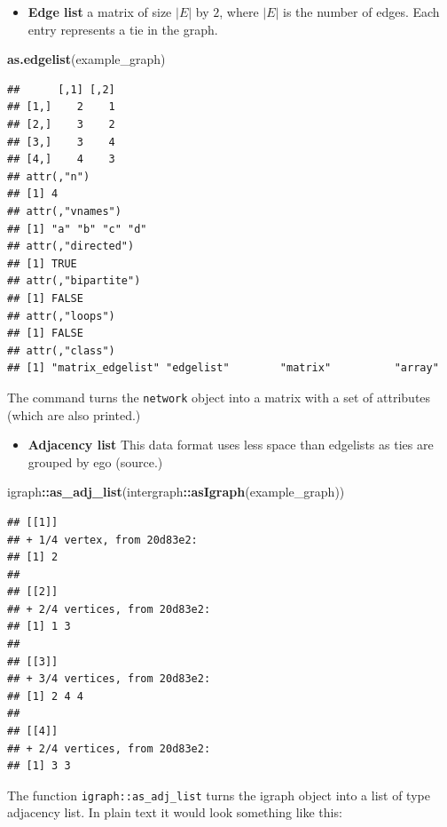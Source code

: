 \documentclass[
]{book}
\newenvironment{Shaded}{\begin{snugshade}}{\end{snugshade}}
\newcommand{\FunctionTok}[1]{\textcolor[rgb]{0.13,0.29,0.53}{\textbf{#1}}}
\newcommand{\NormalTok}[1]{#1}
\newcommand{\SpecialCharTok}[1]{\textcolor[rgb]{0.81,0.36,0.00}{\textbf{#1}}}
\providecommand{\tightlist}{%
  \setlength{\itemsep}{0pt}\setlength{\parskip}{0pt}}
\begin{document}
\begin{itemize}
\tightlist
\item
  \textbf{Edge list} a matrix of size \(|E|\) by \(2\), where \(|E|\) is the number of edges.
  Each entry represents a tie in the graph.
\end{itemize}

\begin{Shaded}
\begin{Highlighting}[]
\FunctionTok{as.edgelist}\NormalTok{(example\_graph)}
\end{Highlighting}
\end{Shaded}

\begin{verbatim}
##      [,1] [,2]
## [1,]    2    1
## [2,]    3    2
## [3,]    3    4
## [4,]    4    3
## attr(,"n")
## [1] 4
## attr(,"vnames")
## [1] "a" "b" "c" "d"
## attr(,"directed")
## [1] TRUE
## attr(,"bipartite")
## [1] FALSE
## attr(,"loops")
## [1] FALSE
## attr(,"class")
## [1] "matrix_edgelist" "edgelist"        "matrix"          "array"
\end{verbatim}

The command turns the \texttt{network} object into a matrix with a set of attributes
(which are also printed.)

\begin{itemize}
\tightlist
\item
  \textbf{Adjacency list} This data format uses less space than edgelists as ties are
  grouped by ego (source.)
\end{itemize}

\begin{Shaded}
\begin{Highlighting}[]
\NormalTok{igraph}\SpecialCharTok{::}\FunctionTok{as\_adj\_list}\NormalTok{(intergraph}\SpecialCharTok{::}\FunctionTok{asIgraph}\NormalTok{(example\_graph)) }
\end{Highlighting}
\end{Shaded}

\begin{verbatim}
## [[1]]
## + 1/4 vertex, from 20d83e2:
## [1] 2
## 
## [[2]]
## + 2/4 vertices, from 20d83e2:
## [1] 1 3
## 
## [[3]]
## + 3/4 vertices, from 20d83e2:
## [1] 2 4 4
## 
## [[4]]
## + 2/4 vertices, from 20d83e2:
## [1] 3 3
\end{verbatim}

The function \texttt{igraph::as\_adj\_list} turns the igraph object into a list of
type adjacency list. In plain text it would look something like this:
\end{document}
